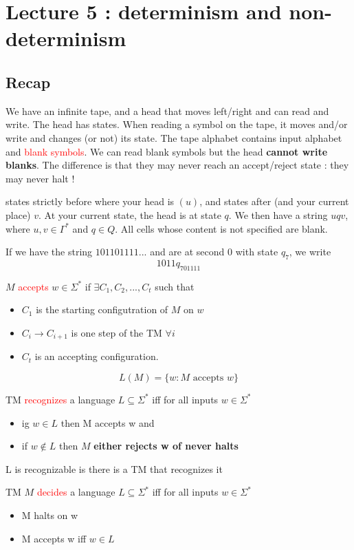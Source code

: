 \documentclass[12pt,a4paper]{article}
\newcommand{\<}{\langle}
\renewcommand{\>}{\rangle}
\begin{document}
\section{Lecture 5 : determinism and non-determinism}
\subsection{Recap}
We have an infinite tape, and a head that moves left/right and can read and write. The head has states. When reading a symbol on the tape, it moves and/or write and changes (or not) its state. The tape alphabet contains input alphabet and \textcolor{red}{blank symbols}. We can read blank symbols but the head \textbf{cannot write blanks}. The difference is that they may never reach an accept/reject state : they may never halt !

 states strictly before where your head is $(u)$, and states after (and your current place) $v$. At your current state, the head is at state $q$. We then have a string $uqv$, where $u,v \in \Gamma^*$ and $q \in Q$. All cells whose content is not specified are blank. 
\begin{exemple}
    If we have the string $101101111...$ and are at second 0 with state $q_7$, we write 
    \[1011q_701111\]
\end{exemple}

 $M$ \textcolor{red}{accepts} $w \in \Sigma^*$ if $\exists C_1,C_2,...,C_t$ such that 
\begin{itemize}
    \item $C_1$ is the starting configutration of $M$ on $w$
    \item $C_i \to C_{i+1}$ is one step of the TM $\forall i$
    \item $C_t$ is an accepting configuration.
\end{itemize}
\[L(M) = \{w : M \text{ accepts } w\}\]

TM \textcolor{red}{recognizes} a language $L \subseteq \Sigma^*$ iff for all inputs $w\in \Sigma^*$
\begin{itemize}
    \item ig $w \in L$ then M accepts w and
    \item if $w \notin L$ then $M$ \textbf{either rejects w of never halts} 
\end{itemize}
L is recognizable is there is a TM that recognizes it

TM $M$ \textcolor{red}{decides} a language $L \subseteq \Sigma^*$ iff for all inputs $w \in \Sigma^*$ 
\begin{itemize}
    \item M halts on w
    \item M accepts w iff $w \in L$
\end{itemize}
\end{document}
